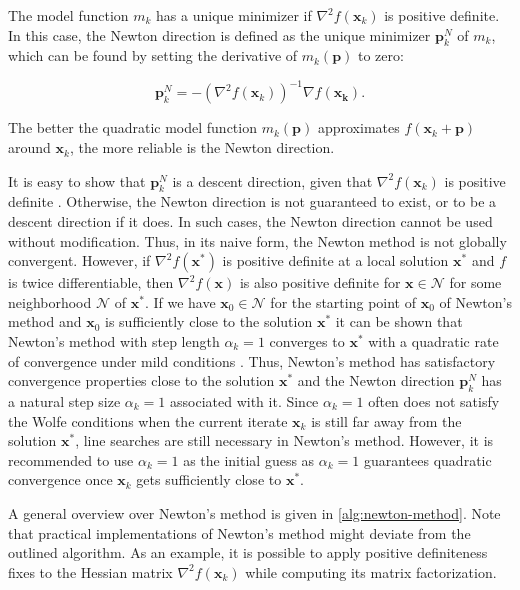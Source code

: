 \noindent The model function $m_k$ has a unique minimizer if $\nabla^2 f(\bm{x}_k)$ is positive definite. In this case, the Newton direction 
is defined
as the unique minimizer $\bm{p}^N_k$ of $m_k$, which can be found by setting the derivative of $m_k(\bm{p})$ to zero:

\begin{equation}\label{eq:newton-diretion}
    \bm{p}^N_k = - (\nabla^2 f(\bm{x}_k))^{-1} \nabla f(\bm{x_k}).
\end{equation}

\noindent The better the quadratic model function $m_k(\bm{p})$ approximates $f(\bm{x}_k + \bm{p})$ around $\bm{x}_k$, the more reliable is the 
Newton direction. 

It is easy to show that $\bm{p}^N_k$ is a descent direction, given that $\nabla^2 f(\bm{x}_k)$ is positive definite \cite{nocedal2006}. 
Otherwise, the Newton direction is not guaranteed to exist, or to be a descent direction if it does. In such cases, the Newton direction cannot 
be used without modification. Thus, in its naive form, the Newton method is not globally convergent. However, if $\nabla^2 f(\bm{x}^*)$ is positive
definite at a local solution $\bm{x}^*$ and $f$ is twice differentiable, then $\nabla^2 f(\bm{x})$ is also positive definite for $\bm{x} \in 
\mathcal{N}$ for some neighborhood $\mathcal{N}$ of $\bm{x}^*$. If we have $\bm{x}_0 \in \mathcal{N}$ for the starting point of $\bm{x}_0$
of Newton's method and $\bm{x}_0$ is sufficiently close to the solution $\bm{x}^*$ it can be shown that Newton's method with step length
$\alpha_k = 1$ converges to $\bm{x}^*$ with a quadratic rate of convergence under mild conditions \cite{nocedal2006}. Thus, Newton's method 
has satisfactory convergence properties close to the solution $\bm{x}^*$ and the Newton direction $\bm{p}^N_k$ has a natural step size 
$\alpha_k = 1$ associated with it. Since $\alpha_k = 1$ often does not satisfy the Wolfe conditions when the current iterate $\bm{x}_k$ is still 
far away from the solution $\bm{x}^*$, line searches are still necessary in Newton's method. However, it is recommended to use $\alpha_k = 1$ as the
initial guess as $\alpha_k = 1$ guarantees quadratic convergence once $\bm{x}_k$ gets sufficiently close to $\bm{x}^*$.

A general overview over Newton's method is given in \cref{alg:newton-method}. Note that practical implementations of Newton's method might deviate
from the outlined algorithm. As an example, it is possible to apply positive definiteness fixes to the Hessian matrix $\nabla^2 f(\bm{x}_k)$
while computing its matrix factorization. 

